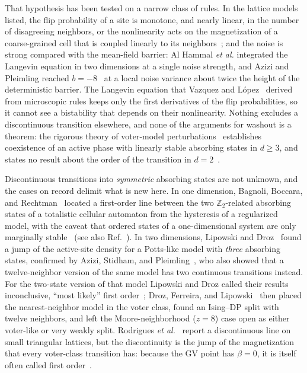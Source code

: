 \documentclass[pre,twocolumn,superscriptaddress,showpacs,floatfix]{revtex4-2}
\begin{document}
That hypothesis has been tested on a narrow class of rules. In the lattice models listed, the
flip probability of a site is monotone, and nearly linear, in the number of disagreeing
neighbors, or the nonlinearity acts on the magnetization of a coarse-grained cell that is coupled
linearly to its neighbors~\cite{azizi2020}; and the noise is strong compared with the mean-field
barrier: Al Hammal \emph{et al.} integrated the Langevin equation in two dimensions at a single
noise strength, and Azizi and Pleimling reached $b = -8$~\cite{azizi2020} at a local noise
variance about twice the height of the deterministic barrier.
The Langevin equation that Vazquez and L\'opez~\cite{vazquez2008} derived from microscopic rules
keeps only the first derivatives of the flip probabilities, so it cannot see a bistability that
depends on their nonlinearity. Nothing excludes a discontinuous transition elsewhere, and none
of the arguments for washout is a theorem: the rigorous theory of voter-model
perturbations~\cite{cox2013,cox2025} establishes coexistence of an active phase with linearly
stable absorbing states in $d \ge 3$, and states no result about the order of the transition in
$d = 2$~\cite{cox2025,chatterjee2013}.

Discontinuous transitions into \emph{symmetric} absorbing states are not unknown, and the cases
on record delimit what is new here. In one dimension, Bagnoli, Boccara, and
Rechtman~\cite{bagnoli2001,bagnoli2005} located a first-order line between the two
$\mathbb{Z}_2$-related absorbing states of a totalistic cellular automaton from the hysteresis of
a regularized model, with the caveat that ordered states of a one-dimensional system are only
marginally stable~\cite{hinrichsen2000fo} (see also Ref.~\cite{bassler1996}). In two dimensions,
Lipowski and Droz~\cite{lipowski2002} found a jump of the active-site density for a Potts-like
model with \emph{three} absorbing states, confirmed by Azizi, Stidham, and
Pleimling~\cite{azizi2018}, who also showed that a twelve-neighbor version of the same model has
two continuous transitions instead. For the two-state version of that model Lipowski and Droz
called their results inconclusive, ``most likely'' first order~\cite{lipowski2002}; Droz,
Ferreira, and Lipowski~\cite{droz2003,droz2003b} then placed the nearest-neighbor model in the
voter class, found an Ising--DP split with twelve neighbors, and left the Moore-neighborhood
($z = 8$) case open as either voter-like or very weakly split. Rodrigues \emph{et
al.}~\cite{rodrigues2015} report a discontinuous line on small triangular lattices, but the
discontinuity is the jump of the magnetization that every voter-class transition has: because
the GV point has $\beta = 0$, it is itself often called first
order~\cite{deoliveira1993,dornic2001,vazquez2010}.
\end{document}
